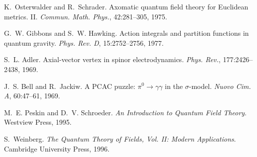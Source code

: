 \documentclass[11pt]{article}
\begin{document}
\begin{thebibliography}{99}
K.~Osterwalder and R.~Schrader.
Axomatic quantum field theory for Euclidean metrics. II.
\emph{Commun. Math. Phys.}, 42:281--305, 1975.

G.~W. Gibbons and S.~W. Hawking.
Action integrals and partition functions in quantum gravity.
\emph{Phys. Rev. D}, 15:2752--2756, 1977.

S.~L. Adler.
Axial-vector vertex in spinor electrodynamics.
\emph{Phys. Rev.}, 177:2426--2438, 1969.

J.~S. Bell and R.~Jackiw.
A PCAC puzzle: $\pi^0\to\gamma\gamma$ in the $\sigma$-model.
\emph{Nuovo Cim. A}, 60:47--61, 1969.

M.~E. Peskin and D.~V. Schroeder.
\emph{An Introduction to Quantum Field Theory}.
Westview Press, 1995.

S.~Weinberg.
\emph{The Quantum Theory of Fields, Vol. II: Modern Applications}.
Cambridge University Press, 1996.

\end{thebibliography}
\end{document}
